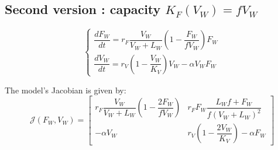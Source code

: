 \documentclass{article}
\begin{document}
%
%
%

\subsection{Second version : capacity $K_F(V_W) = f V_W$}

\begin{equation}
\left\lbrace \begin{array}{l}
\dfrac{dF_W}{dt} = r_F \dfrac{V_W}{V_W + L_W} \left(1 - \dfrac{F_W}{f V_W}\right) F_W \\
\dfrac{dV_W}{dt} = r_V \left(1 - \dfrac{V_W}{K_V}\right) V_W - \alpha V_W F_W
\end{array} \right.
\label{modelWild1}
\end{equation}

The model's Jacobian is given by:
\begin{equation}
\mathcal{J}(F_W, V_W) = \begin{bmatrix}
r_F \dfrac{V_W}{V_W + L_W} \left(1 - \dfrac{2F_W}{fV_W}\right) & r_F F_W \dfrac{L_W f + F_W}{f (V_W + L_W)^2} \\
-\alpha V_W & r_V \left(1 - \dfrac{2V_W}{K_V}\right) - \alpha F_W
\end{bmatrix}
\end{equation}
\end{document}
